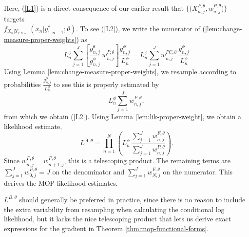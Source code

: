 Here, (\ref{L1}) is a direct consequence of our earlier result that $\{ \big(X^{P,\theta}_{n,j},w^{P,\theta}_{n,j}\big) \}$ targets\\
$f_{X_{n}|Y_{1:n-1}}(x_{n}|y^*_{1:n-1};\theta)$.
To see  (\ref{L2}),
we write the numerator of (\ref{lem:change-measure-proper-weights}) as
\begin{equation}
L^\phi_n \sum_{j=1}^J \left[ \frac{g^\theta_{n,j}}{g^\phi_{n,j}} \, w^{P,\theta}_{n,j}\right] \frac{g^\phi_{n,j}}{L_n^\phi}
= L^\phi_n \sum_{j=1}^J w_{n,j}^{FC,\theta} \, \frac{g^\phi_{n,j}}{L_n^\phi}
\end{equation}
Using Lemma \ref{lem:change-measure-proper-weights}, we resample according to probabilities $\frac{g^\phi_{n,j}}{L_n^\phi}$ to see this is properly estimated by
\begin{equation}
L^\phi_n \sum_{j=1}^J w^{F,\theta}_{n,j},
\end{equation}
from which we obtain (\ref{L2}).
Using Lemma \ref{lem:lik-proper-weight}, we obtain a likelihood estimate,
\begin{equation}
L^{A,\theta} = \prod_{n=1}^N \left( L^\phi_n \, \frac{\sum_{j=1}^J w^{F,\theta}_{n,j}}{\sum_{j=1}^J w^{P,\theta}_{n,j}}\right).
\end{equation}
Since $w^{F,\theta}_{n,j}=w^{P,\theta}_{n+1,j}$, this is a telescoping product. The remaining terms are
$\sum_{j=1}^J w^{P,\theta}_{0,j} = J$ on the denominator and $\sum_{j=1}^J w^{F,\theta}_{N,j}$ on the numerator.
This derives the MOP likelihood estimates.


$L^{B,\theta}$ should generally be preferred in practice, since there is no reason to include the extra variability from resampling when calculating the conditional log likelihood, but it lacks the nice telescoping product that lets us derive exact expressions for the gradient in Theorem \ref{thm:mop-functional-forms}.
